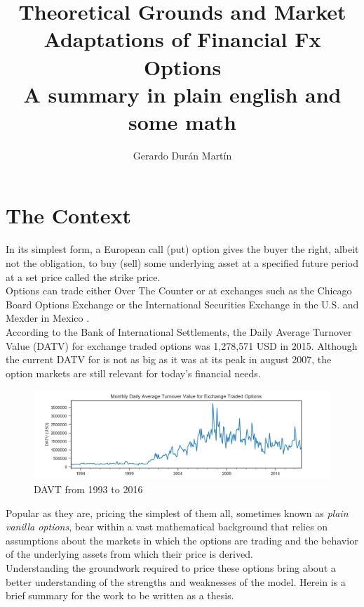 \documentclass{article}
\title{Theoretical Grounds and Market Adaptations of Financial Fx Options \\ \large A summary in plain english and some math}
\author{Gerardo Dur\'an Mart\'in}
\begin{document}
\graphicspath{ {images/} }
\maketitle

\section{The Context}

In its simplest form, a European call (put) option gives the buyer the right, albeit not the obligation, to buy (sell) some underlying asset at a specified future period at a set price called the strike price.\\

Options can trade either Over The Counter or at exchanges such as the Chicago Board Options Exchange or the International Securities Exchange in the U.S.\cite{sec_listed} and Mexder in Mexico \citep{mexder}.\\

According to the Bank of International Settlements, the Daily Average Turnover Value (DATV) for exchange traded options was 1,278,571 USD in 2015. Although the current DATV for is not as big as it was at its peak in august 2007, the option markets are still relevant for today's financial needs.

\begin{figure}[h!]
    \centering
    \includegraphics[width=1.0\textwidth]{DAVT}
    \caption{DAVT from 1993 to 2016}
\end{figure}

Popular as they are, pricing the simplest of them all, sometimes known as \textit{plain vanilla options}, bear within a vast mathematical background that relies on assumptions about the markets in which the options are trading and the behavior of the underlying assets from which their price is derived.\\

Understanding the groundwork required to price these options bring about a better understanding of the strengths and weaknesses of the model. Herein is a brief summary for the work to be written as a thesis.
\end{document}
